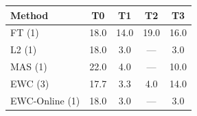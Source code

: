 \begin{tabular}{lcccc}
\toprule
Method & T0 & T1 & T2 & T3 \\
\midrule
FT (1) & 18.0 & 14.0 & 19.0 & 16.0 \\
L2 (1) & 18.0 & 3.0 & --- & 3.0 \\
MAS (1) & 22.0 & 4.0 & --- & 10.0 \\
EWC (3) & 17.7 & 3.3 & 4.0 & 14.0 \\
EWC-Online (1) & 18.0 & 3.0 & --- & 3.0 \\
\bottomrule
\end{tabular}